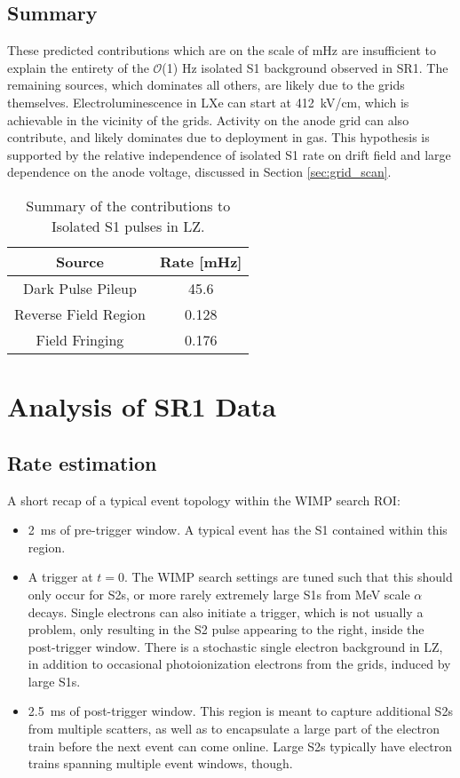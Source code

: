 \subsection{Summary}

These predicted contributions which are on the scale of mHz are insufficient to explain the entirety of the $\mathcal{O}$(1) Hz isolated S1 background observed in SR1.
The remaining sources, which dominates all others, are likely due to the grids themselves.
Electroluminescence in LXe can start at 412~kV/cm\cite{aprile_measurements_2014}, which is achievable in the vicinity of the grids.
Activity on the anode grid can also contribute, and likely dominates due to deployment in gas.
This hypothesis is supported by the relative independence of isolated S1 rate on drift field and large dependence on the anode voltage, discussed in Section \ref{sec:grid_scan}.

\begin{table}
\centering
\begin{tabular}{|cc|}
\hline
     Source & Rate [mHz]  \\
     \hline
     Dark Pulse Pileup & 45.6  \\
     Reverse Field Region & 0.128 \\
     Field Fringing &  0.176\\
     \hline
\end{tabular}
\label{tab:sources_acc}
\caption {Summary of the contributions to Isolated S1 pulses in LZ.}
\end{table}
\afterpage{\FloatBarrier}
\section {Analysis of SR1 Data}
\subsection{Rate estimation}

A short recap of a typical event topology within the WIMP search ROI:
\begin{itemize}
    \item 2~ms of pre-trigger window. A typical event has the S1 contained within this region. 
    \item A trigger at $t=0$. The WIMP search settings are tuned such that this should only occur for S2s, or more rarely extremely large S1s from MeV scale $\alpha$ decays.
    Single electrons can also initiate a trigger, which is not usually a problem, only resulting in the S2 pulse appearing to the right, inside the post-trigger window.
    There is a stochastic single electron background in LZ, in addition to occasional photoionization electrons from the grids, induced by large S1s.
    \item 2.5~ms of post-trigger window. This region is meant to capture additional S2s from multiple scatters, as well as to encapsulate a large part of the electron train before the next event can come online.
    Large S2s typically have electron trains spanning multiple event windows, though.
\end{itemize}

